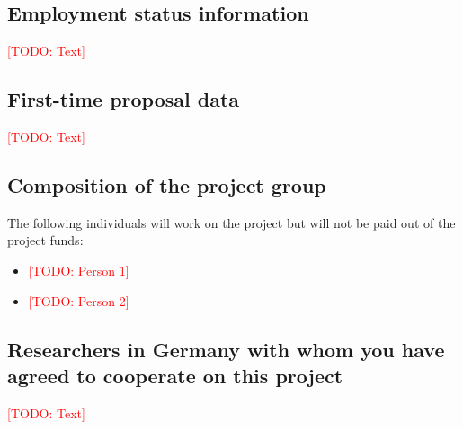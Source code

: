 \documentclass[american,firsttime]{dfgproposal}
\newcommand{\todo}[1]{\xspace{\textcolor{red}{[TODO: #1]}}\xspace}
\begin{document}
	
	\subsection{Employment status information}
	\todo{Text}
	
	\subsection{First-time proposal data}
	\todo{Text}
	
	
	
	\subsection{Composition of the project group}
	The following individuals will work on the project but will not be paid out of
	the project funds:
	\begin{itemize}
		\item \todo{Person 1}
		\item \todo{Person 2}
	\end{itemize}
	
	
	\subsection{Researchers in Germany with whom you have agreed to cooperate on this project}
	\todo{Text}
	
\end{document}
